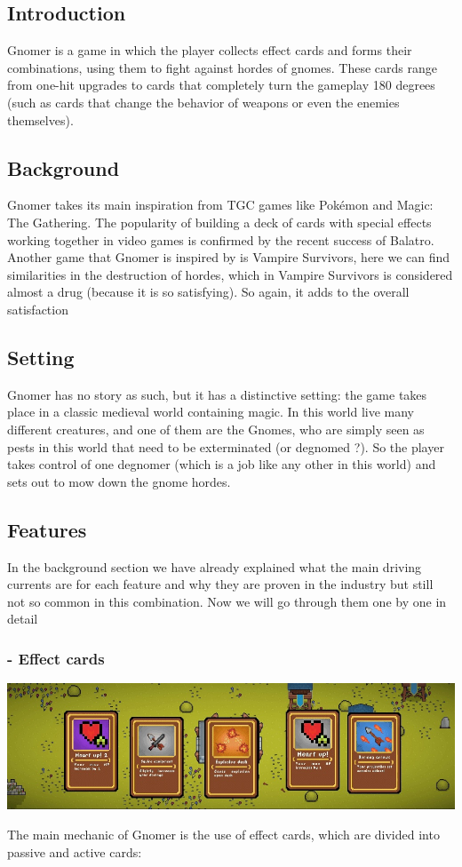 \documentclass[a4paper,10pt,english]{article}
\begin{document}
\subsection*{Introduction}
Gnomer is a game in which the player collects effect cards and forms their combinations, using them to fight against hordes of gnomes. These cards range from one-hit upgrades to cards that completely turn the gameplay 180 degrees (such as cards that change the behavior of weapons or even the enemies themselves).

\subsection*{Background}
Gnomer takes its main inspiration from TGC games like Pokémon and Magic: The Gathering. The popularity of building a deck of cards with special effects working together in video games is confirmed by the recent success of Balatro.
Another game that Gnomer is inspired by is Vampire Survivors, here we can find similarities in the destruction of hordes, which in Vampire Survivors is considered almost a drug (because it is so satisfying). So again, it adds to the overall satisfaction

\subsection*{Setting}
Gnomer has no story as such, but it has a distinctive setting: the game takes place in a classic medieval world containing magic. In this world live many different creatures, and one of them are the Gnomes, who are simply seen as pests in this world that need to be exterminated (or degnomed ?). So the player takes control of one degnomer (which is a job like any other in this world) and sets out to mow down the gnome hordes.

\subsection*{Features}
In the background section we have already explained what the main driving currents are for each feature and why they are proven in the industry but still not so common in this combination. Now we will go through them one by one in detail

\subsubsection*{ - Effect cards}
\begin{center}
    \includegraphics[width=1\textwidth]{cards.jpg}
\end{center}
The main mechanic of Gnomer is the use of effect cards, which are divided into passive and active cards:\newline
\end{document}
